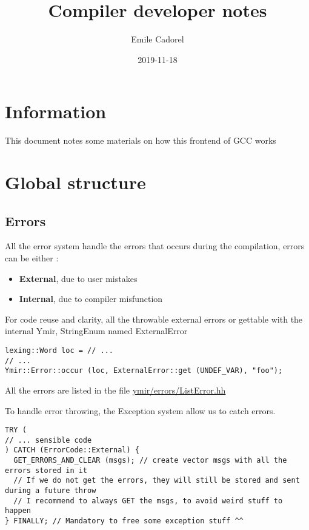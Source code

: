 \documentclass[11pt]{article}
\author{Emile Cadorel}
\date{2019-11-18}
\title{Compiler developer notes}
\begin{document}
\maketitle
\setcounter{tocdepth}{2}
\tableofcontents


\section*{Information}
\label{sec:orgb23b426}


This document notes some materials on how this frontend of GCC works


\section*{Global structure}
\label{sec:orge462128}

\subsection*{Errors}
\label{sec:orgb9c8aac}

All the error system handle the errors that occurs during the compilation, errors can be either : 
\begin{itemize}
\item \textbf{External}, due to user mistakes
\item \textbf{Internal}, due to compiler misfunction
\end{itemize}

For code reuse and clarity, all the throwable external errors or gettable with the internal Ymir, StringEnum named ExternalError


\begin{verbatim}
lexing::Word loc = // ...
// ...
Ymir::Error::occur (loc, ExternalError::get (UNDEF_VAR), "foo");
\end{verbatim}

All the errors are listed in the file \href{./errors/ListError.hh}{ymir/errors/ListError.hh}


To handle error throwing, the Exception system allow us to catch errors.

\begin{verbatim}
TRY (
// ... sensible code
) CATCH (ErrorCode::External) {
  GET_ERRORS_AND_CLEAR (msgs); // create vector msgs with all the errors stored in it
  // If we do not get the errors, they will still be stored and sent during a future throw
  // I recommend to always GET the msgs, to avoid weird stuff to happen
} FINALLY; // Mandatory to free some exception stuff ^^
\end{verbatim}
\end{document}
